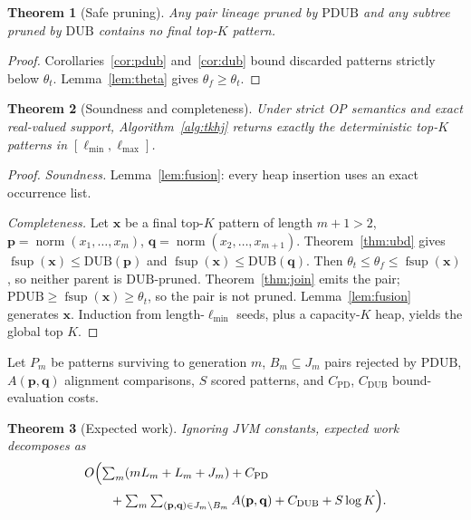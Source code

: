 \documentclass[preprint,12pt]{elsarticle}
\DeclareMathOperator{\fsup}{fsup}
\DeclareMathOperator{\norm}{norm}
\newcommand{\DUB}{\mathrm{DUB}}
\newcommand{\PDUB}{\mathrm{PDUB}}
\theoremstyle{plain}
\newtheorem{theorem}{Theorem}
\theoremstyle{definition}
\theoremstyle{remark}
\begin{document}
\begin{theorem}[Safe pruning]
\label{thm:prune}
Any pair lineage pruned by $\PDUB$ and any subtree pruned by $\DUB$ contains no final top-$K$ pattern.
\end{theorem}
\begin{proof}
Corollaries~\ref{cor:pdub} and~\ref{cor:dub} bound discarded patterns strictly below $\theta_t$. Lemma~\ref{lem:theta} gives $\theta_f\ge\theta_t$.
\end{proof}

\begin{theorem}[Soundness and completeness]
\label{thm:exact}
Under strict OP semantics and exact real-valued support, Algorithm~\ref{alg:tkhj} returns exactly the deterministic top-$K$ patterns in $[\ell_{\min},\ell_{\max}]$.
\end{theorem}
\begin{proof}
\emph{Soundness.} Lemma~\ref{lem:fusion}: every heap insertion uses an exact occurrence list.

\emph{Completeness.} Let $\mathbf{x}$ be a final top-$K$ pattern of length $m+1>2$, $\mathbf{p}=\norm(x_1,\ldots,x_m)$, $\mathbf{q}=\norm(x_2,\ldots,x_{m+1})$. Theorem~\ref{thm:ubd} gives $\fsup(\mathbf{x})\le\DUB(\mathbf{p})$ and $\fsup(\mathbf{x})\le\DUB(\mathbf{q})$. Then $\theta_t\le\theta_f\le\fsup(\mathbf{x})$, so neither parent is $\DUB$-pruned. Theorem~\ref{thm:join} emits the pair; $\PDUB\ge\fsup(\mathbf{x})\ge\theta_t$, so the pair is not pruned. Lemma~\ref{lem:fusion} generates $\mathbf{x}$. Induction from length-$\ell_{\min}$ seeds, plus a capacity-$K$ heap, yields the global top $K$.
\end{proof}

Let $P_m$ be patterns surviving to generation $m$, $B_m\subseteq J_m$ pairs rejected by $\PDUB$, $A(\mathbf{p},\mathbf{q})$ alignment comparisons, $S$ scored patterns, and $C_{\mathrm{PD}}$, $C_{\mathrm{DUB}}$ bound-evaluation costs.

\begin{theorem}[Expected work]
\label{thm:work}
Ignoring JVM constants, expected work decomposes as
\begin{equation}
\label{eq:work}
\begin{aligned}
&O\Bigl(\textstyle\sum_m(mL_m+L_m+J_m)+C_{\mathrm{PD}}\\
&\qquad+\textstyle\sum_m\sum_{(\mathbf{p},\mathbf{q})\in J_m\setminus B_m}A(\mathbf{p},\mathbf{q})
+C_{\mathrm{DUB}}+S\log K\Bigr).
\end{aligned}
\end{equation}
\end{theorem}
\end{document}
